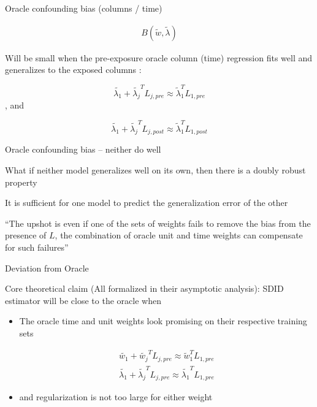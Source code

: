 \documentclass{beamer}
\begin{document}
 \begin{frame}{Oracle confounding bias (columns / time)}

\begin{eqnarray*}
B(\widetilde{w}, \widetilde{\lambda}) 
\end{eqnarray*}

\bigskip

Will be small when the pre-exposure oracle column (time) regression fits well and generalizes to the exposed columns :
 
 $$\widetilde{\lambda_1} + \widetilde{\lambda_{j}}^TL_{j,pre} \approx \widetilde{\lambda}_1^TL_{1,pre}$$, and
 
 $$\widetilde{\lambda_1} + \widetilde{\lambda_{j}}^TL_{j,post} \approx \widetilde{\lambda}_1^TL_{1,post}$$
 
 \end{frame}


\begin{frame}{Oracle confounding bias -- neither do well}

What if neither model generalizes well on its own, then there is a doubly robust property

\bigskip

It is sufficient for one model to predict the generalization error of the other

\bigskip

``The upshot is even if one of the sets of weights fails to remove the bias from the presence of $L$, the combination of oracle unit and time weights can compensate for such failures''

\end{frame}

\begin{frame}{Deviation from Oracle}

Core theoretical claim (All formalized in their asymptotic analysis): SDID estimator will be close to the oracle when

\begin{itemize}
\item  The oracle time and unit weights look promising on their respective training sets

\begin{eqnarray*}
\widetilde{w_1} + \widetilde{w_j}^TL_{j,pre} \approx \widetilde{w}_1^T L_{1,pre} \\
\widetilde{\lambda_1} + \widetilde{\lambda_j}^TL_{j,pre} \approx \widetilde{\lambda_1}^T L_{1,pre} 
\end{eqnarray*}

\item and regularization is not too large for either weight
\end{itemize}

\end{frame}
\end{document}
